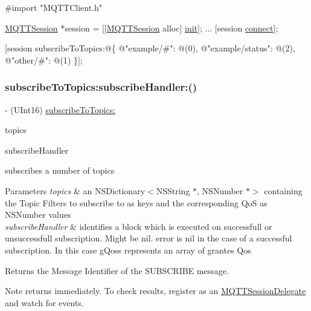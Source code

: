 \begin{DoxyCode}
\textcolor{preprocessor}{#import "MQTTClient.h"}

\hyperlink{interface_m_q_t_t_session}{MQTTSession} *session = [[\hyperlink{interface_m_q_t_t_session}{MQTTSession} alloc] \hyperlink{interface_m_q_t_t_session_aee55d52a9b6395f1a0d73b672900629c}{init}];
...
[session \hyperlink{interface_m_q_t_t_session_ad443eb80793d71150a825513303405b5}{connect}];

[session subscribeToTopics:@\{
\textcolor{stringliteral}{@"example/#"}: @(0),
\textcolor{stringliteral}{@"example/status"}: @(2),
\textcolor{stringliteral}{@"other/#"}: @(1)
\}];
\end{DoxyCode}
 \mbox{\label{interface_m_q_t_t_session_a26abfdc1d64491bff4825727042e3342}} 
\subsubsection{\texorpdfstring{subscribe\+To\+Topics\+:subscribe\+Handler\+:()}{subscribeToTopics:subscribeHandler:()}}
{\footnotesize\ttfamily -\/ (U\+Int16) \hyperlink{interface_m_q_t_t_session_ad90eef680e3adc29a75556e4131bdbf6}{subscribe\+To\+Topics\+:} \begin{DoxyParamCaption}\item[{(N\+S\+Dictionary$<$ N\+S\+String $\ast$, N\+S\+Number $\ast$ $>$ $\ast$)}]{topics }\item[{subscribeHandler:(M\+Q\+T\+T\+Subscribe\+Handler)}]{subscribe\+Handler }\end{DoxyParamCaption}}

subscribes a number of topics


\begin{DoxyParams}{Parameters}
{\em topics} & an N\+S\+Dictionary$<$\+N\+S\+String $\ast$, N\+S\+Number $\ast$$>$ containing the Topic Filters to subscribe to as keys and the corresponding QoS as N\+S\+Number values \\
\hline
{\em subscribe\+Handler} & identifies a block which is executed on successfull or unsuccessfull subscription. Might be nil. error is nil in the case of a successful subscription. In this case g\+Qoss represents an array of grantes Qos\\
\hline
\end{DoxyParams}
\begin{DoxyReturn}{Returns}
the Message Identifier of the S\+U\+B\+S\+C\+R\+I\+BE message.
\end{DoxyReturn}
\begin{DoxyNote}{Note}
returns immediately. To check results, register as an \hyperlink{class_m_q_t_t_session_delegate-p}{M\+Q\+T\+T\+Session\+Delegate} and watch for events.
\end{DoxyNote}

